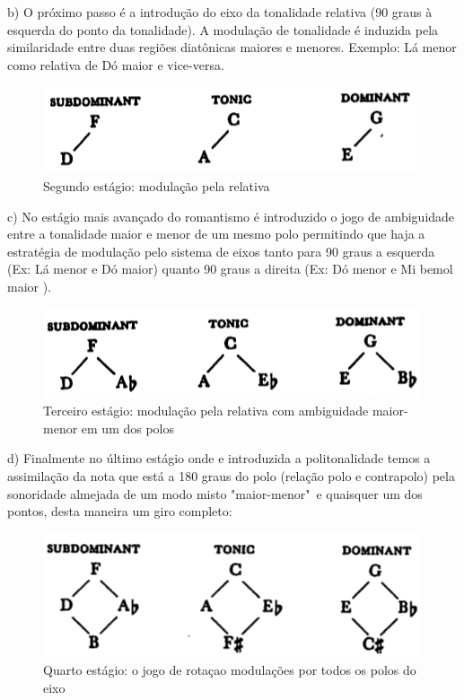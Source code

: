\documentclass[
	12pt,				%
	openright,			%
	twoside,			%
	a4paper,			%
	english,			%
	french,				%
	spanish,			%
	brazil				%
	]{abntex2}
\begin{document}
b) O próximo passo é a introdução do eixo da tonalidade relativa (90 graus à esquerda do ponto da tonalidade). A modulação de tonalidade é induzida pela similaridade entre duas regiões diatônicas maiores e menores. Exemplo: Lá menor como relativa de Dó maior e vice-versa.

\begin{figure}[!h]
	\caption{\label{fig_grafico}Segundo estágio: modulação pela relativa}
	\begin{center}
	    \includegraphics[scale=0.5]{axis/estagio02.png}
	\end{center}
\end{figure}


c) No estágio mais avançado do romantismo é introduzido o jogo de ambiguidade entre a tonalidade maior e menor de um mesmo polo permitindo que haja a estratégia de modulação pelo sistema de eixos tanto para 90 graus a esquerda (Ex: Lá menor e Dó maior) quanto 90 graus a direita (Ex: Dó menor e Mi bemol maior ).

\begin{figure}[!h]
	\caption{\label{fig_grafico}Terceiro estágio: modulação pela relativa com ambiguidade maior-menor em um dos polos }
	\begin{center}
	    \includegraphics[scale=0.5]{axis/estagio03.png}
	\end{center}
\end{figure}

\pagebreak
d) Finalmente no último estágio onde e introduzida a politonalidade temos a assimilação da nota que está a 180 graus do polo (relação polo e contrapolo) pela sonoridade almejada de um modo misto "maior-menor"\ e quaisquer um dos pontos, desta maneira um giro completo:


\begin{figure}[!h]
	\caption{\label{fig_grafico}Quarto estágio: o jogo de rotaçao modulações por todos os polos do eixo }
	\begin{center}
	    \includegraphics[scale=0.5]{axis/estagio04.png}
	\end{center}
\end{figure}
\end{document}
